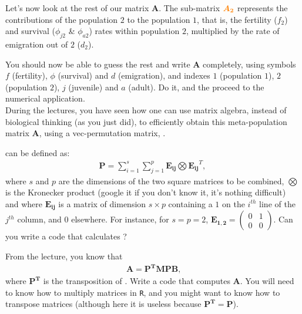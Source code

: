 \documentclass{article}\usepackage[]{graphicx}\usepackage[]{color}
\begin{document}
Let's now look at the rest of our matrix $\boldsymbol{A}$. The sub-matrix $\boldsymbol{\color{orange}{A_2}}$ represents the contributions of the population $2$ to the population $1$, that is, the fertility ($f_2$) and survival ($\phi_{j2}$ & $\phi_{a2}$) rates within population $2$, multiplied by the rate of emigration out of $2$ ($d_2$).

You should now be able to guess the rest and write $\boldsymbol{A}$ completely, using symbols $f$ (fertility), $\phi$ (survival) and $d$ (emigration), and indexes $1$ (population $1$), $2$ (population $2$), $j$ (juvenile) and $a$ (adult).
Do it, and the proceed to the numerical application.\\


During the lectures, you have seen how one can use matrix algebra, instead of biological thinking (as you just did), to efficiently obtain this meta-population matrix $\boldsymbol{A}$, using a vec-permutation matrix, .

 can be defined as:
\begin{align*}
\boldsymbol{P} = \sum\limits_{i=1}^s  \sum\limits_{j=1}^p \boldsymbol{E_{ij}} \bigotimes \boldsymbol{E_{ij}}^T\text{, }
\end{align*}
where $s$ and $p$ are the dimensions of the two square matrices to be combined, $\bigotimes$ is the Kronecker product (google it if you don't know it, it's nothing difficult) and where $\boldsymbol{E_{ij}}$ is a matrix of dimension $s\times p$ containing a $1$ on the $i^{th}$ line of the $j^{th}$ column, and $0$ elsewhere. 
For instance, for $s=p=2$, $\boldsymbol{E_{1,2}} = \begin{pmatrix} 0 & 1 \\ 0 & 0 \end{pmatrix}$.
Can you write a code that calculates ?



From the lecture, you know that
\begin{align*}
\boldsymbol{A} = \boldsymbol{P^T}\boldsymbol{M}\boldsymbol{P}\boldsymbol{B} \text{,}
\end{align*}
where $\boldsymbol{P^T}$ is the transposition of . 
Write a code that computes $\boldsymbol{A}$. You will need to know how to multiply matrices in \texttt{R}, and you might want to know how to transpose matrices (although here it is useless because $\boldsymbol{P^T}=\boldsymbol{P}$).
\end{document}
